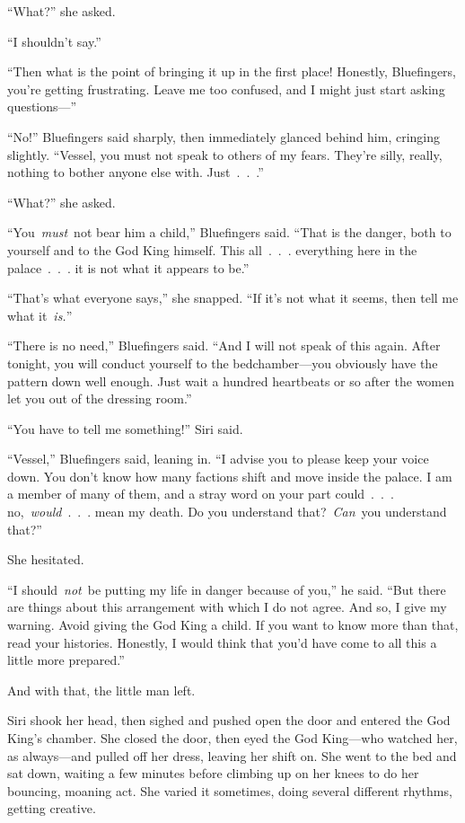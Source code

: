 “What?” she asked.

“I shouldn’t say.”

“Then what is the point of bringing it up in the first place! Honestly, Bluefingers, you’re getting frustrating. Leave me too confused, and I might just start asking questions—”

“No!” Bluefingers said sharply, then immediately glanced behind him, cringing slightly. “Vessel, you must not speak to others of my fears. They’re silly, really, nothing to bother anyone else with. Just~.~.~.”

“What?” she asked.

“You~\textit{must}~not bear him a child,” Bluefingers said. “That is the danger, both to yourself and to the God King himself. This all~.~.~. everything here in the palace~.~.~. it is not what it appears to be.”

“That’s what everyone says,” she snapped. “If it’s not what it seems, then tell me what it~\textit{is.}”

“There is no need,” Bluefingers said. “And I will not speak of this again. After tonight, you will conduct yourself to the bedchamber—you obviously have the pattern down well enough. Just wait a hundred heartbeats or so after the women let you out of the dressing room.”

“You have to tell me something!” Siri said.

“Vessel,” Bluefingers said, leaning in. “I advise you to please keep your voice down. You don’t know how many factions shift and move inside the palace. I am a member of many of them, and a stray word on your part could~.~.~. no,~\textit{would}~.~.~. mean my death. Do you understand that?~\textit{Can}~you understand that?”

She hesitated.

“I should~\textit{not}~be putting my life in danger because of you,” he said. “But there are things about this arrangement with which I do not agree. And so, I give my warning. Avoid giving the God King a child. If you want to know more than that, read your histories. Honestly, I would think that you’d have come to all this a little more prepared.”

And with that, the little man left.

Siri shook her head, then sighed and pushed open the door and entered the God King’s chamber. She closed the door, then eyed the God King—who watched her, as always—and pulled off her dress, leaving her shift on. She went to the bed and sat down, waiting a few minutes before climbing up on her knees to do her bouncing, moaning act. She varied it sometimes, doing several different rhythms, getting creative.

